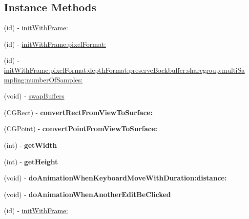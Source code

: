 \subsection*{Instance Methods}
\begin{DoxyCompactItemize}
\item 
(id) -\/ \hyperlink{interfaceCCEAGLView_a7d569f8fad8006eaa02d9b60f3877e43}{init\+With\+Frame\+:}
\item 
(id) -\/ \hyperlink{interfaceCCEAGLView_ad2edc9a56bec3887260f222686111d34}{init\+With\+Frame\+:pixel\+Format\+:}
\item 
(id) -\/ \hyperlink{interfaceCCEAGLView_adaca2cf585c2dc4881a07bc78a0fad61}{init\+With\+Frame\+:pixel\+Format\+:depth\+Format\+:preserve\+Backbuffer\+:sharegroup\+:multi\+Sampling\+:number\+Of\+Samples\+:}
\item 
(void) -\/ \hyperlink{interfaceCCEAGLView_adb64cde54fee9dedd5004416f59fc0a7}{swap\+Buffers}
\item 
\mbox{\label{interfaceCCEAGLView_a9a39b024ce381e836ba7dc52476d4f61}} 
(C\+G\+Rect) -\/ {\bfseries convert\+Rect\+From\+View\+To\+Surface\+:}
\item 
\mbox{\label{interfaceCCEAGLView_a1abe9b7e051d6c2cccd0ea7d31df7aad}} 
(C\+G\+Point) -\/ {\bfseries convert\+Point\+From\+View\+To\+Surface\+:}
\item 
\mbox{\label{interfaceCCEAGLView_ab7255befab3b5c559c069265ff18205c}} 
(int) -\/ {\bfseries get\+Width}
\item 
\mbox{\label{interfaceCCEAGLView_ac466334393f7b0d0c30f1a29c4d34f47}} 
(int) -\/ {\bfseries get\+Height}
\item 
\mbox{\label{interfaceCCEAGLView_a803433071ee9f83f12e09d16112c60ab}} 
(void) -\/ {\bfseries do\+Animation\+When\+Keyboard\+Move\+With\+Duration\+:distance\+:}
\item 
\mbox{\label{interfaceCCEAGLView_a1b689dd226db20805c42c5aaeb6a8408}} 
(void) -\/ {\bfseries do\+Animation\+When\+Another\+Edit\+Be\+Clicked}
\item 
(id) -\/ \hyperlink{interfaceCCEAGLView_a7d569f8fad8006eaa02d9b60f3877e43}{init\+With\+Frame\+:}
\item 

\end{DoxyCompactItemize}
